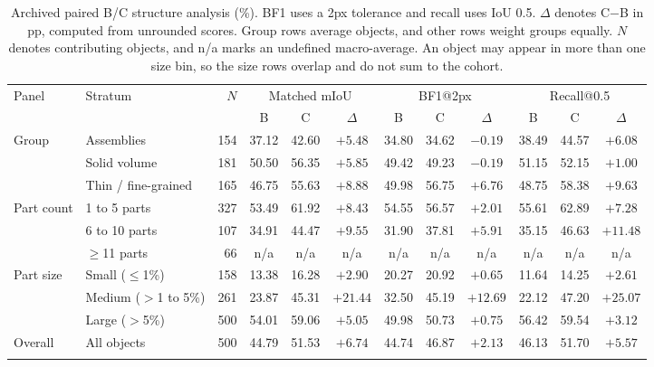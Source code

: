 \documentclass[pdflatex,sn-mathphys-ay]{sn-jnl}
\begin{document}
\begin{table}[t]
\caption{Archived paired B/C structure analysis (\%). BF1 uses a 2px tolerance and recall uses IoU 0.5. $\Delta$ denotes C$-$B in pp, computed from unrounded scores. Group rows average objects, and other rows weight groups equally. $N$ denotes contributing objects, and n/a marks an undefined macro-average. An object may appear in more than one size bin, so the size rows overlap and do not sum to the cohort.}
\label{tab:strata}
\footnotesize
\setlength{\tabcolsep}{2pt}
\begin{tabular*}{\textwidth}{@{}l@{\hspace{3pt}}l@{\extracolsep{\fill}}rccccccccc@{}}
\toprule
Panel & Stratum & $N$ & \multicolumn{3}{c}{Matched mIoU} & \multicolumn{3}{c}{BF1@2px} & \multicolumn{3}{c}{Recall@0.5}\\
\cmidrule(lr){4-6}\cmidrule(lr){7-9}\cmidrule(l){10-12}
 & & & B & C & $\Delta$ & B & C & $\Delta$ & B & C & $\Delta$\\
\midrule
Group & Assemblies & 154 & 37.12 & 42.60 & $+5.48$ & 34.80 & 34.62 & $-0.19$ & 38.49 & 44.57 & $+6.08$\\
 & Solid volume & 181 & 50.50 & 56.35 & $+5.85$ & 49.42 & 49.23 & $-0.19$ & 51.15 & 52.15 & $+1.00$\\
 & Thin / fine-grained & 165 & 46.75 & 55.63 & $+8.88$ & 49.98 & 56.75 & $+6.76$ & 48.75 & 58.38 & $+9.63$\\
\midrule
Part count & 1 to 5 parts & 327 & 53.49 & 61.92 & $+8.43$ & 54.55 & 56.57 & $+2.01$ & 55.61 & 62.89 & $+7.28$\\
 & 6 to 10 parts & 107 & 34.91 & 44.47 & $+9.55$ & 31.90 & 37.81 & $+5.91$ & 35.15 & 46.63 & $+11.48$\\
 & $\geq$11 parts & 66 & n/a & n/a & n/a & n/a & n/a & n/a & n/a & n/a & n/a\\
\midrule
Part size & Small ($\leq$1\%) & 158 & 13.38 & 16.28 & $+2.90$ & 20.27 & 20.92 & $+0.65$ & 11.64 & 14.25 & $+2.61$\\
 & Medium ($>$1 to 5\%) & 261 & 23.87 & 45.31 & $+21.44$ & 32.50 & 45.19 & $+12.69$ & 22.12 & 47.20 & $+25.07$\\
 & Large ($>$5\%) & 500 & 54.01 & 59.06 & $+5.05$ & 49.98 & 50.73 & $+0.75$ & 56.42 & 59.54 & $+3.12$\\
\midrule
Overall & All objects & 500 & 44.79 & 51.53 & $+6.74$ & 44.74 & 46.87 & $+2.13$ & 46.13 & 51.70 & $+5.57$\\
\botrule
\end{tabular*}
\end{table}
\end{document}
